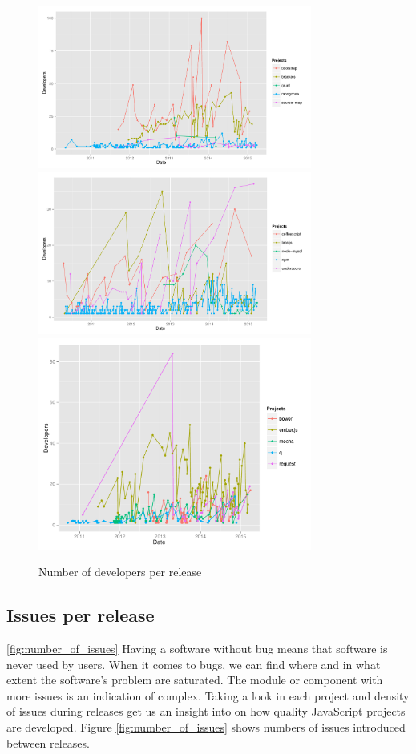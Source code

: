 \begin{figure}[thb!]
	\caption{Number of developers per release}
	\label{fig:number_of_developers}
	\includegraphics[width=90mm,scale=0.5]{figures/number_of_developers}
	\includegraphics[width=90mm,scale=0.5]{figures/number_of_developers_2}
		\includegraphics[width=90mm,scale=0.5]{figures/number_of_developers_3}
\end{figure}

\subsection{Issues per release}


\ref{fig:number_of_issues}
Having a software without bug means that software is never used by users. When it comes to bugs, we can find where and in what extent the software's problem are saturated. The module or component with more issues is an indication of complex. Taking a look in each project and density of issues during releases get us an insight into on how quality JavaScript projects are developed. Figure \ref{fig:number_of_issues} shows numbers of issues introduced between releases.

